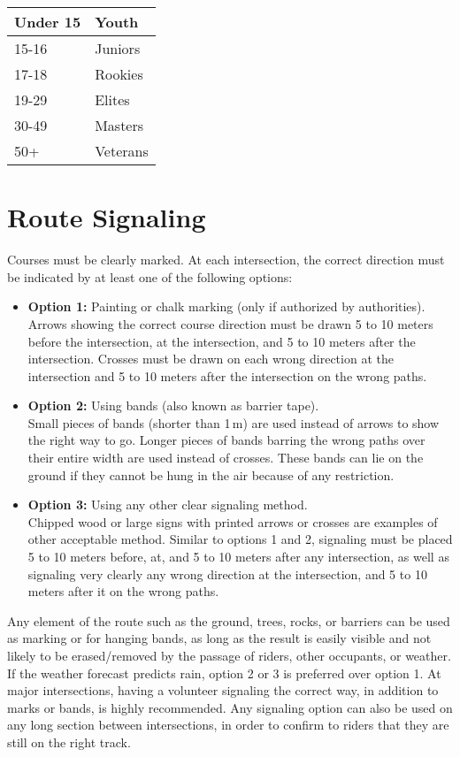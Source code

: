 \begin{tabular}{|l|l|}
\hline
Under 15 & Youth \\
\hline
15-16 & Juniors \\
\hline
17-18 & Rookies \\
\hline
19-29 & Elites \\
\hline
30-49 & Masters \\
\hline
50+ & Veterans \\
\hline
\end{tabular}

\section{Route Signaling}
Courses must be clearly marked.
At each intersection, the correct direction must be indicated by at least one of the following options:
\begin{itemize}
\item \textbf{Option 1:} Painting or chalk marking (only if authorized by authorities).\\
Arrows showing the correct course direction must be drawn 5 to 10 meters before the intersection, at the intersection, and 5 to 10 meters after the intersection.
Crosses must be drawn on each wrong direction at the intersection and 5 to 10 meters after the intersection on the wrong paths.
\item \textbf{Option 2:} Using bands (also known as barrier tape).\\
Small pieces of bands (shorter than 1\,m) are used instead of arrows to show the right way to go.
Longer pieces of bands barring the wrong paths over their entire width are used instead of crosses.
These bands can lie on the ground if they cannot be hung in the air because of any restriction.
\item \textbf{Option 3:} Using any other clear signaling method.\\
Chipped wood or large signs with printed arrows or crosses are examples of other acceptable method.
Similar to options 1 and 2, signaling must be placed 5 to 10 meters before, at, and 5 to 10 meters after any intersection, as well as signaling very clearly any wrong direction at the intersection, and 5 to 10 meters after it on the wrong paths.
\end{itemize}
Any element of the route such as the ground, trees, rocks, or barriers can be used as marking or for hanging bands, as long as the result is easily visible and not likely to be erased/removed by the passage of riders, other occupants, or weather.
If the weather forecast predicts rain, option 2 or 3 is preferred over option 1.
At major intersections, having a volunteer signaling the correct way, in addition to marks or bands, is highly recommended.
Any signaling option can also be used on any long section between intersections, in order to confirm to riders that they are still on the right track.

